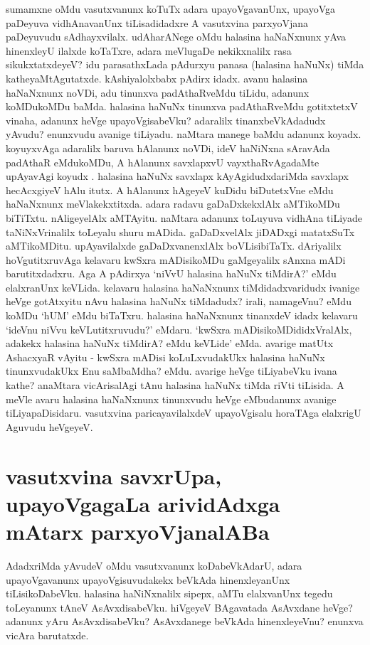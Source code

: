 sumamxne oMdu vasutxvanunx koTuTx adara upayoVgavanUnx, upayoVga paDeyuva vidhAnavanUnx tiLisadidadxre A vasutxvina parxyoVjana paDeyuvudu sAdhayxvilalx. udAharANege oMdu halasina haNaNxnunx yAva hinenxleyU ilalxde koTaTxre, adara meVlugaDe nekikxnalilx rasa sikukxtatxdeyeV? idu parasathxLada pAdurxyu panasa (halasina haNuNx) tiMda katheyaMtAgutatxde. kAshiyalolxbabx pAdirx idadx. avanu halasina haNaNxnunx noVDi, adu tinunxva padAthaRveMdu tiLidu, adanunx koMDukoMDu baMda. halasina haNuNx tinunxva padAthaRveMdu gotitxtetxV vinaha, adanunx heVge upayoVgisabeVku? adaralilx tinanxbeVkAdadudx yAvudu? enunxvudu avanige tiLiyadu. naMtara manege baMdu adanunx koyadx. koyuyxvAga adaralilx baruva hAlanunx noVDi, ideV haNiNxna sAravAda padAthaR eMdukoMDu, A hAlanunx savxlapxvU vayxthaRvAgadaMte upAyavAgi koyudx . halasina haNuNx savxlapx kAyAgidudxdariMda savxlapx hecAcxgiyeV hAlu itutx. A hAlanunx hAgeyeV kuDidu biDutetxVne eMdu haNaNxnunx meVlakekxtitxda. adara radavu gaDaDxkekxlAlx aMTikoMDu biTiTxtu. nAligeyelAlx aMTAyitu. naMtara adanunx toLuyuva vidhAna tiLiyade taNiNxVrinalilx toLeyalu shuru mADida. gaDaDxvelAlx jiDADxgi matatxSuTx aMTikoMDitu. upAyavilalxde gaDaDxvanenxlAlx boVLisibiTaTx. dAriyalilx hoVgutitxruvAga kelavaru kwSxra mADisikoMDu gaMgeyalilx sAnxna mADi barutitxdadxru. Aga A pAdirxya `niVvU halasina haNuNx tiMdirA?' eMdu elalxranUnx keVLida. kelavaru halasina haNaNxnunx tiMdidadxvaridudx ivanige heVge gotAtxyitu nAvu halasina haNuNx tiMdadudx? irali, namageVnu? eMdu koMDu `hUM' eMdu biTaTxru. halasina haNaNxnunx tinanxdeV idadx kelavaru `ideVnu niVvu keVLutitxruvudu?' eMdaru. `kwSxra mADisikoMDididxVralAlx, adakekx halasina haNuNx tiMdirA? eMdu keVLide' eMda. avarige matUtx AshacxyaR vAyitu - kwSxra mADisi koLuLxvudakUkx halasina haNuNx tinunxvudakUkx Enu saMbaMdha? eMdu. avarige heVge tiLiyabeVku ivana kathe? anaMtara vicArisalAgi tAnu halasina haNuNx tiMda riVti tiLisida. A meVle avaru halasina haNaNxnunx tinunxvudu heVge eMbudanunx avanige tiLiyapaDisidaru. vasutxvina paricayavilalxdeV upayoVgisalu horaTAga elalxrigU Aguvudu heVgeyeV.


\section*{vasutxvina savxrUpa, upayoVgagaLa arividAdxga mAtarx  parxyoVjanalABa}

AdadxriMda yAvudeV oMdu vasutxvanunx koDabeVkAdarU, adara upayoVgavanunx upayoVgisuvudakekx beVkAda hinenxleyanUnx tiLisikoDabeVku. halasina haNiNxnalilx sipepx, aMTu elalxvanUnx tegedu toLeyanunx tAneV AsAvxdisabeVku. hiVgeyeV BAgavatada AsAvxdane heVge? adanunx yAru AsAvxdisabeVku? AsAvxdanege beVkAda hinenxleyeVnu? enunxva vicAra barutatxde. 

